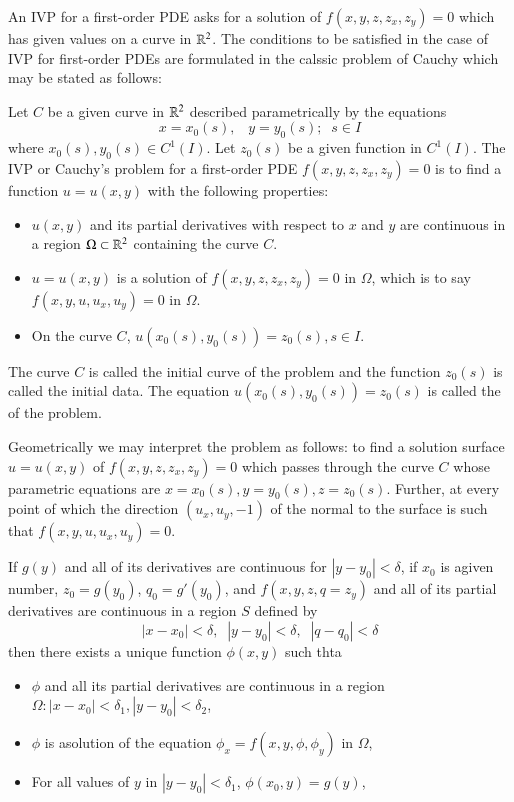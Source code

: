 An IVP for a first-order PDE asks for a solution of $f(x,y,z,z_x,z_y) = 0$ which has given values on a curve in $\mathbb R^2$. The conditions to be satisfied in the case of IVP for first-order PDEs are formulated in the calssic problem of Cauchy which may be stated as follows:

\begin{construction}
    Let $C$ be a given curve in $\mathbb R^2$ described parametrically by the equations $$x=x_0(s),\;\;\;y=y_0(s);\;\;s \in I$$ where $x_0(s),y_0(s) \in C^1(I)$. Let $z_0(s)$ be a given function in $C^1(I)$. The IVP or Cauchy's problem for a first-order PDE $f(x,y,z,z_x,z_y) = 0$ is to find a function $u = u(x,y)$ with the following properties:\begin{itemize}
        \item $u(x,y)$ and its partial derivatives with respect to $x$ and $y$ are continuous in a region $\Omega \subset \mathbb R^2$ containing the curve $C$.
        \item $u = u(x,y)$ is a solution of $f(x,y,z,z_x,z_y) = 0$ in $\Omega$, which is to say $f(x,y,u,u_x,u_y) = 0$ in $\Omega$.
        \item On the curve $C$, $u(x_0(s),y_0(s)) = z_0(s), s \in I$.
    \end{itemize}
    The curve $C$ is called the initial curve of the problem and the function $z_0(s)$ is called the initial data. The equation $u(x_0(s),y_0(s)) = z_0(s)$ is called the  of the problem.
\end{construction}

Geometrically we may interpret the problem as follows: to find a solution surface $u = u(x,y)$ of $f(x,y,z,z_x,z_y) = 0$ which passes through the curve $C$ whose parametric equations are $x=x_0(s),y=y_0(s),z=z_0(s)$. Further, at every point of which the direction $(u_x,u_y,-1)$ of the normal to the surface is such that $f(x,y,u,u_x,u_y) = 0$.

\begin{theorem}[Kowalewski]
    If $g(y)$ and all of its derivatives are continuous for $|y-y_0| < \delta$, if $x_0$ is agiven number, $z_0 = g(y_0)$, $q_0 = g'(y_0)$, and $f(x,y,z,q = z_y)$ and all of its partial derivatives are continuous in a region $S$ defined by \begin{equation*}
        |x-x_0| < \delta, \;\;|y-y_0| < \delta,\;\;|q-q_0| < \delta
    \end{equation*}
    then there exists a unique function $\phi(x,y)$ such thta \begin{itemize}
        \item $\phi$ and all its partial derivatives are continuous in a region $\Omega:|x-x_0| < \delta_1,|y-y_0|<\delta_2$,
        \item $\phi$ is asolution of the equation $\phi_x = f(x,y,\phi,\phi_y)$ in $\Omega$,
        \item For all values of $y$ in $|y-y_0| < \delta_1$, $\phi(x_0,y) = g(y)$,
    \end{itemize}
\end{theorem}



